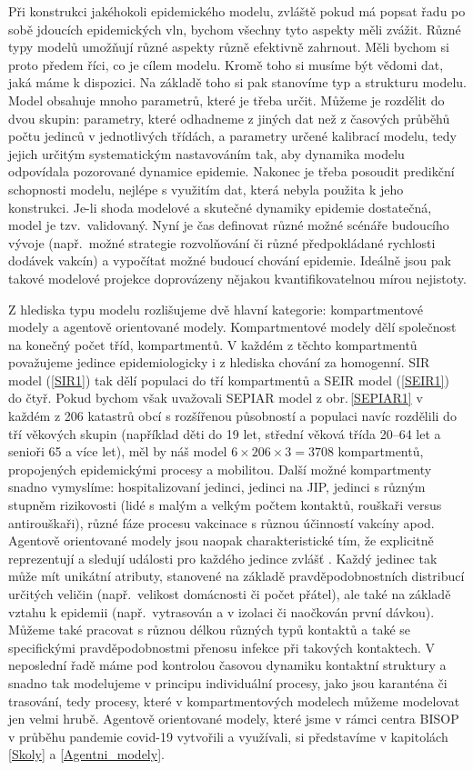 Při konstrukci jakéhokoli epidemického modelu, zvláště pokud má popsat řadu po sobě jdoucích epidemických vln, bychom všechny tyto aspekty měli zvážit. Různé typy modelů umožňují různé aspekty různě efektivně zahrnout. Měli bychom si proto předem říci, co je cílem modelu. Kromě toho si musíme být vědomi dat, jaká máme k dispozici. Na základě toho si pak stanovíme typ a strukturu modelu. Model obsahuje mnoho parametrů, které je třeba určit. Můžeme je rozdělit do dvou skupin: parametry, které odhadneme z jiných dat než z časových průběhů počtu jedinců v jednotlivých třídách, a parametry určené kalibrací modelu, tedy jejich určitým systematickým nastavováním tak, aby dynamika modelu odpovídala pozorované dynamice epidemie. Nakonec je třeba posoudit predikční schopnosti modelu, nejlépe s využitím dat, která nebyla použita k jeho konstrukci. Je-li shoda modelové a skutečné dynamiky epidemie dostatečná, model je tzv.\ validovaný. Nyní je čas definovat různé možné scénáře budoucího vývoje (např.\ možné strategie rozvolňování či různé předpokládané rychlosti dodávek vakcín) a vypočítat možné budoucí chování epidemie. Ideálně jsou pak takové modelové projekce doprovázeny nějakou kvantifikovatelnou mírou nejistoty.

Z hlediska typu modelu rozlišujeme dvě hlavní kategorie: kompartmentové modely a agentově orientované modely. Kompartmentové modely dělí společnost na konečný počet tříd, kompartmentů. V každém z těchto kompartmentů považujeme jedince epidemiologicky i z hlediska chování za homogenní. SIR model (\ref{SIR1}) tak dělí populaci do tří kompartmentů a SEIR model (\ref{SEIR1}) do čtyř. Pokud bychom však uvažovali SEPIAR model z obr.\,\ref{SEPIAR1} v každém z 206 katastrů obcí s rozšířenou působností a populaci navíc rozdělili do tří věkových skupin (například děti do 19 let, střední věková třída 20--64 let a senioři 65 a více let), měl by náš model $6 \times 206 \times 3 = 3708$ kompartmentů, propojených epidemickými procesy a mobilitou. Další možné kompartmenty snadno vymyslíme: hospitalizovaní jedinci, jedinci na JIP, jedinci s různým stupněm rizikovosti (lidé s malým a velkým počtem kontaktů, rouškaři versus antirouškaři), různé fáze procesu vakcinace s různou účinností vakcíny apod. Agentově orientované modely jsou naopak charakteristické tím, že explicitně reprezentují a sledují události pro každého jedince zvlášť \cite{Smith_etal2018}. Každý jedinec tak může mít unikátní atributy, stanovené na základě pravděpodobnostních distribucí určitých veličin (např.\ velikost domácnosti či počet přátel), ale také na základě vztahu k epidemii (např.\ vytrasován a v izolaci či naočkován první dávkou). Můžeme také pracovat s různou délkou různých typů kontaktů a také se specifickými pravděpodobnostmi přenosu infekce při takových kontaktech. V neposlední řadě máme pod kontrolou časovou dynamiku kontaktní struktury a snadno tak modelujeme v principu individuální procesy, jako jsou karanténa či trasování, tedy procesy, které v kompartmentových modelech můžeme modelovat jen velmi hrubě. Agentově orientované modely, které jsme v rámci centra BISOP v průběhu pandemie covid-19 vytvořili a využívali, si představíme v kapitolách \ref{Skoly} a \ref{Agentni_modely}.  

